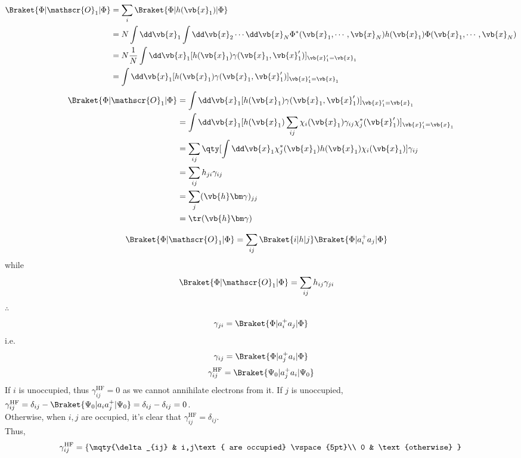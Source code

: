 \documentclass[a4paper]{article}
\begin{document}
\begin{align}
\Braket{\Phi | \mathscr{O}_1 | \Phi} &= \sum_i \Braket{\Phi | h(\vb{x}_1) | \Phi} \notag\\
&= N \int\dd\vb{x}_1 \int\dd\vb{x}_2\cdots\dd\vb{x}_N \Phi^*(\vb{x}_1,\cdots,\vb{x}_N) h(\vb{x}_1) \Phi(\vb{x}_1,\cdots,\vb{x}_N) \notag\\
&= N \dfrac{1}{N}\int\dd\vb{x}_1 [h(\vb{x}_1) \gamma(\vb{x}_1,\vb{x}'_1)]_{\vb{x}'_1=\vb{x}_1} \notag\\
&= \int\dd\vb{x}_1 [h(\vb{x}_1) \gamma(\vb{x}_1,\vb{x}'_1)]_{\vb{x}'_1=\vb{x}_1}
\end{align}
\begin{align}
\Braket{\Phi | \mathscr{O}_1 | \Phi} 
&= \int\dd\vb{x}_1 [h(\vb{x}_1) \gamma(\vb{x}_1,\vb{x}'_1)]_{\vb{x}'_1=\vb{x}_1} \notag\\
&= \int\dd\vb{x}_1 [h(\vb{x}_1) \sum_{ij} \chi_i(\vb{x}_1) \gamma_{ij} \chi_j^*(\vb{x}'_1)]_{\vb{x}'_1=\vb{x}_1} \notag\\
&= \sum_{ij} \qty[\int\dd\vb{x}_1 \chi_j^*(\vb{x}_1) h(\vb{x}_1)\chi_i(\vb{x}_1)] \gamma_{ij}  \notag\\
&= \sum_{ij} h_{ji} \gamma_{ij} \notag\\
&= \sum_j (\vb{h}\bm\gamma)_{jj} \notag\\
&= \tr (\vb{h}\bm\gamma)
\end{align}

\begin{align}
\Braket{\Phi | \mathscr{O}_1 | \Phi} 
&= \sum_{ij} \Braket{i | h | j} \Braket{\Phi | a_i^+ a_j | \Phi}
\end{align}
while
\begin{align}
\Braket{\Phi | \mathscr{O}_1 | \Phi} 
&= \sum_{ij} h_{ij} \gamma_{ji} 
\end{align}
$ \therefore $
\begin{equation}\label{key}
\gamma_{ji} = \Braket{\Phi | a_i^+ a_j | \Phi}
\end{equation}
i.e.
\begin{equation}\label{key}
\gamma_{ij} = \Braket{\Phi | a_j^+ a_i | \Phi}
\end{equation}
\begin{equation}\label{key}
\gamma_{ij}^{\text{HF}} = \Braket{\Psi_0 | a_j^+ a_i | \Psi_0} %
\end{equation}
If $ i $ is unoccupied, thus $ \gamma_{ij}^{\text{HF}} = 0 $ as we cannot annihilate electrons from it. If $ j $ is unoccupied, \\
$ \gamma_{ij}^{\text{HF}} = \delta_{ij} - \Braket{\Psi_0 | a_i a_j^+ | \Psi_0} = \delta_{ij} - \delta_{ij} = 0 $.\\
Otherwise, when $ i,j $ are occupied, it's clear that $ \gamma_{ij}^{\text{HF}} = \delta_{ij} $.\\
Thus,
\begin{equation}\label{key}
\gamma_{ij}^{\text{HF}} = \left\{
\mqty{\delta_{ij} & i,j\text{ are occupied} \vspace{5pt}\\
	  0 & \text{otherwise} }\right.
\end{equation}
\end{document}
